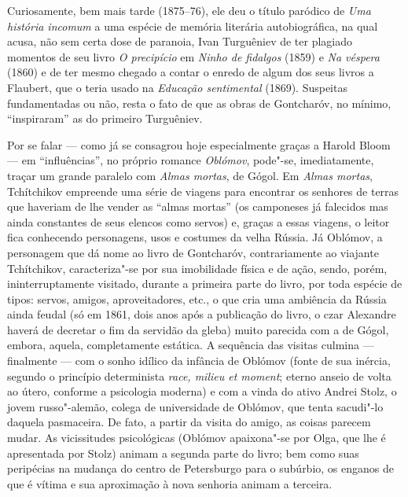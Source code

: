 Curiosamente, bem mais tarde (1875--76), ele deu o título paródico de \emph{Uma história incomum} a uma espécie de memória literária autobiográfica, na qual acusa, não sem certa dose de paranoia, Ivan Turguêniev de ter plagiado momentos de seu livro \emph{O precipício} em \emph{Ninho de fidalgos} (1859) e \emph{Na véspera} (1860) e de ter mesmo chegado a contar o enredo de algum dos seus livros a Flaubert, que o teria usado na \emph{Educação sentimental} (1869). Suspeitas fundamentadas ou não, resta o fato de que as obras de Gontcharóv, no mínimo, ``inspiraram'' as do primeiro Turguêniev.

Por se falar --- como já se consagrou hoje especialmente graças a
Harold Bloom --- em ``influências'', no próprio romance
\emph{Oblómov}, pode"-se, imediatamente, traçar um grande paralelo
com \emph{Almas mortas}, de Gógol. Em \emph{Almas mortas}, Tchítchikov
empreende uma série de viagens para encontrar os senhores de terras
que haveriam de lhe vender as ``almas mortas'' (os camponeses já
falecidos mas ainda constantes de seus elencos como servos) e, graças
a essas viagens, o leitor fica conhecendo personagens, usos e costumes
da velha Rússia. Já Oblómov, a personagem que dá nome ao livro de Gontcharóv,
contrariamente ao viajante Tchítchikov, caracteriza"-se por sua
imobilidade física e de ação, sendo, porém, ininterruptamente
visitado, durante a primeira parte do livro, por toda espécie
de tipos: servos, amigos, aproveitadores, etc., o que cria uma
ambiência da Rússia ainda feudal (só em 1861, dois anos após
a publicação do livro, o czar Alexandre  haverá de
decretar o fim da servidão da gleba) muito parecida com a de Gógol,
embora, aquela, completamente estática. A sequência das visitas culmina ---
finalmente --- com o sonho idílico da infância de Oblómov
(fonte de sua inércia, segundo o princípio determinista \emph{race,
milieu et moment}; eterno anseio de volta ao útero, conforme a
psicologia moderna) e com a vinda do ativo Andrei Stolz, o jovem
russo"-alemão, colega de universidade de Oblómov, que tenta
sacudi"-lo daquela pasmaceira. De fato, a partir da visita do
amigo, as coisas parecem mudar. As vicissitudes psicológicas
(Oblómov apaixona"-se por Olga, que lhe é apresentada por Stolz)
animam a segunda parte do livro; bem como suas peripécias na
mudança do centro de Petersburgo para o subúrbio, os enganos
de que é vítima e sua aproximação à nova senhoria animam a
terceira.

